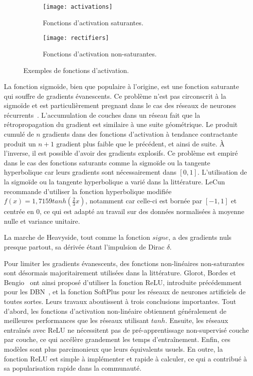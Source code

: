 \begin{figure}[t]
  \begin{subfigure}[b]{0.5\textwidth}
    \texttt{[image: activations]}
    \caption{Fonctions d'activation saturantes.}
    \label{fig:activations}
  \end{subfigure}
\begin{subfigure}[b]{0.5\textwidth}
  \texttt{[image: rectifiers]}
  \caption{Fonctions d'activation non-saturantes.}
  \label{fig:rectifiers}
\end{subfigure}
\caption{Exemples de fonctions d'activation.}
\label{fig:activations}
\end{figure}

La fonction sigmoïde, bien que populaire à l'origine, est une fonction saturante qui souffre de gradients évanescents. Ce problème n'est pas circonscrit à la sigmoïde et est particulièrement pregnant dans le cas des réseaux de neurones récurrents~\cite{hochreiter_gradient_2001}. L'accumulation de couches dans un réseau fait que la rétropropagation du gradient est similaire à une suite géométrique. Le produit cumulé de $n$ gradients dans des fonctions d'activation à tendance contractante produit un $n+1$ gradient plus faible que le précédent, et ainsi de suite. À l'inverse, il est possible d'avoir des gradients explosifs. Ce problème est empiré dans le cas des fonctions saturants comme la sigmoïde ou la tangente hyperbolique car leurs gradients sont nécessairement dans $[0,1]$. L'utilisation de la sigmoïde ou la tangente hyperbolique a varié dans la littérature. LeCun~\cite{lecun_efficient_1998} recommande d'utiliser la fonction hyperbolique modifiée $f(x) = 1,7159 tanh(\frac{2}{3} x)$, notamment car celle-ci est bornée par $[-1,1]$ et centrée en 0, ce qui est adapté au travail sur des données normalisées à moyenne nulle et variance unitaire.

La marche de Heavyside, tout comme la fonction $signe$, a des gradients nuls presque partout, sa dérivée étant l'impulsion de Dirac $\delta$.

Pour limiter les gradients évanescents, des fonctions non-linéaires non-saturantes sont désormais majoritairement utilisées dans la littérature. Glorot, Bordes et Bengio~\cite{glorot_deep_2011} ont ainsi proposé d'utiliser la fonction \gls{ReLU}, introduite précédemment pour les \gls{DBN}~\cite{nair_rectified_2010}, et la fonction SoftPlus pour les réseaux de neurones artificiels de toutes sortes. Leurs travaux aboutissent à trois conclusions importantes. Tout d'abord, les fonctions d'activation non-linéaire obtiennent généralement de meilleures performances que les réseaux utilisant $tanh$. Ensuite, les réseaux entraînés avec \gls{ReLU} ne nécessitent pas de pré-apprentissage non-supervisé couche par couche, ce qui accélère grandement les temps d'entraînement. Enfin, ces modèles sont plus parcimonieux que leurs équivalents usuels. En outre, la fonction \gls{ReLU} est simple à implémenter et rapide à calculer, ce qui a contribué à sa popularisation rapide dans la communauté.

